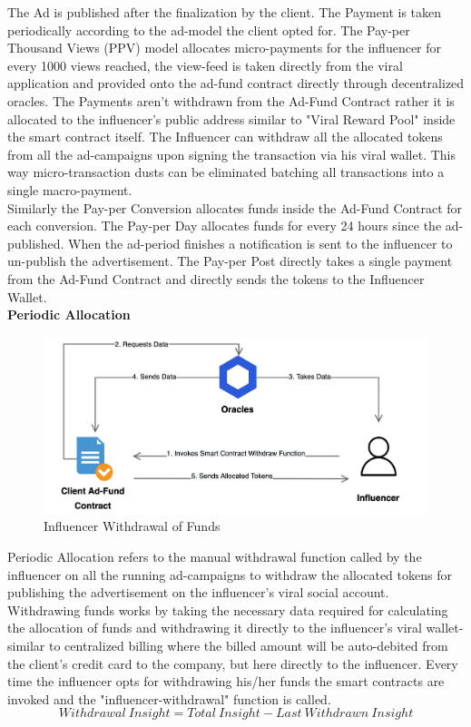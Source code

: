 \documentclass[10pt]{article}
\begin{document}
The Ad is published after the finalization by the client. The Payment is taken periodically according to the ad-model the client opted for. The Pay-per Thousand Views (PPV) model allocates micro-payments for the influencer for every 1000 views reached, the view-feed is taken directly from the viral application and provided onto the ad-fund contract directly through decentralized oracles. The Payments aren't withdrawn from the Ad-Fund Contract rather it is allocated to the influencer's public address similar to "Viral Reward Pool" inside the smart contract itself. The Influencer can withdraw all the allocated tokens from all the ad-campaigns upon signing the transaction via his viral wallet. This way micro-transaction dusts can be eliminated batching all transactions into a single macro-payment. \\

Similarly the Pay-per Conversion allocates funds inside the Ad-Fund Contract for each conversion. The Pay-per Day allocates funds for every 24 hours since the ad-published. When the ad-period finishes a notification is sent to the influencer to un-publish the advertisement. The Pay-per Post directly takes a single payment from the Ad-Fund Contract and directly sends the tokens to the Influencer Wallet.\\

\textbf{Periodic Allocation}\\

\begin{figure}[H]
\begin{center}
\includegraphics[width=13cm]{periodic-allocation}
\caption{Influencer Withdrawal of Funds}
\end{center}
\end{figure}

Periodic Allocation refers to the manual withdrawal function called by the influencer on all the running ad-campaigns to withdraw the allocated tokens for publishing the advertisement on the influencer's viral social account. Withdrawing funds works by taking the necessary data required for  calculating the allocation of funds and withdrawing it directly to the influencer's viral wallet- similar to centralized billing where the billed amount will be auto-debited from the client's credit card to the company, but here directly to the influencer. Every time the influencer opts for withdrawing his/her funds the smart contracts are invoked and the "influencer-withdrawal" function is called.\\
\begin{equation}
Withdrawal\:Insight=Total\:Insight-Last\:Withdrawn\:Insight
\end{equation}
\end{document}

